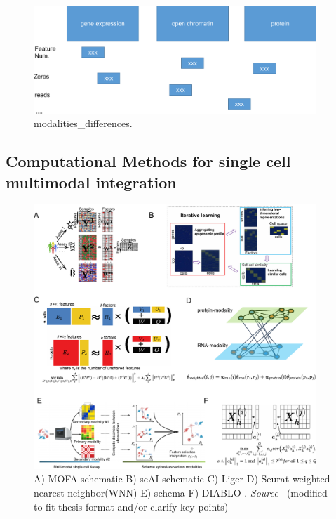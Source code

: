 \begin{figure}[!ht]
	\centering
	\includegraphics[width=0.95\textwidth]{modalities_differences/fig}
	\vspace{0.1cm}
	\caption[modalities\_differences.]{
	modalities\_differences.}
	\label{fig:modalities_differences}
\end{figure}



\subsection{Computational Methods for single cell multimodal integration}

\begin{figure}[!ht]
	\centering
	\includegraphics[width=0.95\textwidth]{multimodal_integration_methods_schematic/fig}
	\vspace{0.1cm}
	\caption[multimodal\_integration\_methods\_schematic.]{
	A) MOFA schematic B) scAI schematic C) Liger D) Seurat weighted nearest neighbor(WNN) E) schema  F) DIABLO . \emph{Source ~\cite{tewari2017mofa,jin2020scai,kriebel2022uinmf,hao2021seurat4,singh2021schema,singh2019diablo}}(modified to fit thesis format and/or clarify key points)}
	\label{fig:multimodal_integration_methods_schematic}
\end{figure}


